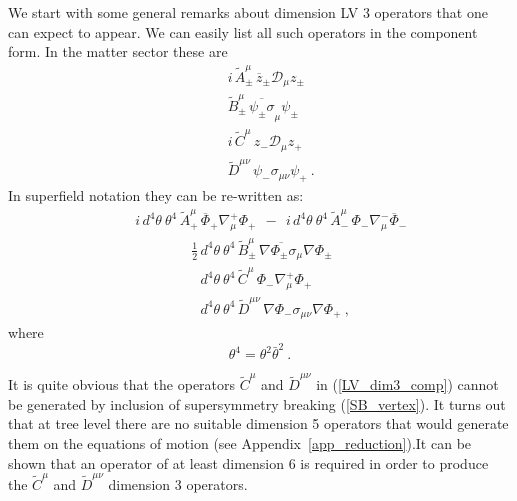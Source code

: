 \documentclass[12pt]{revtex4}
\begin{document}
We start with some general remarks about dimension LV 3 operators 
that one can expect to appear. 
We can easily list all such operators in the component form. In the matter sector these
are
\begin{eqnarray}
\nonumber
&& i\, \widetilde{A}_\pm^\mu\, \overline{z}_\pm 
\mathcal{D}_\mu z_\pm \\
\label{LV_dim3_comp}
&& \widetilde{B}_\pm^\mu\, \overline{\psi_\pm\sigma}_\mu 
      \psi_\pm \\
\nonumber
&& i\, \widetilde{C}^\mu\, z_- \mathcal{D}_\mu z_+ \\
\nonumber
&& \widetilde{D}^{\mu\nu}\, \psi_- \sigma_{\mu\nu} 
     \psi_+~.
\end{eqnarray}
In superfield notation they can be re-written as:
\begin{eqnarray}
\nonumber
&&
i\,  d^4\theta~ \theta^4\, \widetilde{A}_+^\mu\, 
\overline{\Phi}_+ \nabla^+_\mu \Phi_+
~~-~~
i\,  d^4\theta~ \theta^4\, \widetilde{A}_-^\mu\, \Phi_- 
                        \nabla^-_\mu 
    \overline{\Phi}_-  \\
\label{LV_dim3}
&&
\qquad
\qquad
\frac{1}{2}\,
 d^4\theta~ \theta^4\, \widetilde{B}_\pm^\mu\, 
\overline{\nabla \Phi_\pm \sigma_\mu} \nabla \Phi_\pm \\
\nonumber
&&
\qquad
\qquad
\phantom{\frac{1}{2}\,}
d^4\theta~ \theta^4\, \widetilde{C}^\mu\, 
\Phi_- \nabla_\mu^+ \Phi_+ \\
\nonumber 
&&
\qquad
\qquad
\phantom{\frac{1}{2}\,}
d^4\theta~ \theta^4\, \widetilde{D}^{\mu\nu}\,
\nabla \Phi_- \sigma_{\mu\nu} \nabla \Phi_+~, 
\end{eqnarray}
where
\[
\theta^4 = \theta^2 \bar\theta^2~.
\]

It is quite obvious that the operators $ \widetilde{C}^\mu $
and $ \widetilde{D}^{\mu\nu} $ in (\ref{LV_dim3_comp}) cannot
be generated by inclusion of supersymmetry breaking (\ref{SB_vertex}). 
It turns out that at tree level there are no suitable dimension 5 operators
that would generate them on the equations of motion
(see Appendix~\ref{app_reduction}).It can be shown that an operator 
    of at least dimension 6 is required 
in order to produce the $ \widetilde{C}^\mu $
and $ \widetilde{D}^{\mu\nu} $ dimension 3 operators.
\end{document}
